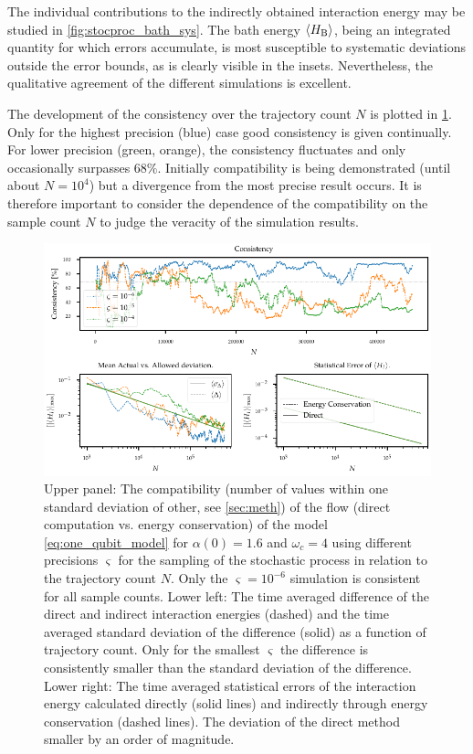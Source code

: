 The individual contributions to the indirectly obtained interaction
energy may be studied in \cref{fig:stocproc_bath_sys}. The bath energy
\(\ev{H_{\bath}}\), being an integrated quantity for which errors
accumulate, is most susceptible to systematic deviations outside the
error bounds, as is clearly visible in the insets. Nevertheless, the
qualitative agreement of the different simulations is excellent.

The development of the consistency over the trajectory count \(N\) is
plotted in \cref{fig:stocproc_consistency_dev}. Only for the highest
precision (blue) case good consistency is given continually. For lower
precision (green, orange), the consistency fluctuates and only
occasionally surpasses \(68\%\). Initially compatibility is being
demonstrated (until about \(N=10^4\)) but a divergence from
the most precise result occurs. It is therefore important to consider
the dependence of the compatibility on the sample count \(N\) to judge
the veracity of the simulation results.
\begin{figure}[htp]
  \centering
  \includegraphics{figs/one_bath_syst/stocproc_systematics_consistency}
  \caption{\label{fig:stocproc_consistency_dev} Upper panel: The
    compatibility (number of values within one standard deviation of
    other, see \cref{sec:meth}) of the flow (direct computation
    vs. energy conservation) of the model \cref{eq:one_qubit_model}
    for \(α(0)=1.6\) and \(ω_c=4\) using different precisions
    \(\varsigma\) for the sampling of the stochastic process in
    relation to the trajectory count \(N\). Only the
    \(\varsigma=10^{-6}\) simulation is consistent for all sample
    counts. Lower left: The time averaged difference of the direct and
    indirect interaction energies (dashed) and the time averaged
    standard deviation of the difference (solid) as a function of
    trajectory count. Only for the smallest \(\varsigma\) the
    difference is consistently smaller than the standard deviation of
    the difference. Lower right: The time averaged statistical errors
    of the interaction energy calculated directly (solid lines) and
    indirectly through energy conservation (dashed lines). The
    deviation of the direct method smaller by an order of magnitude.}
\end{figure}

